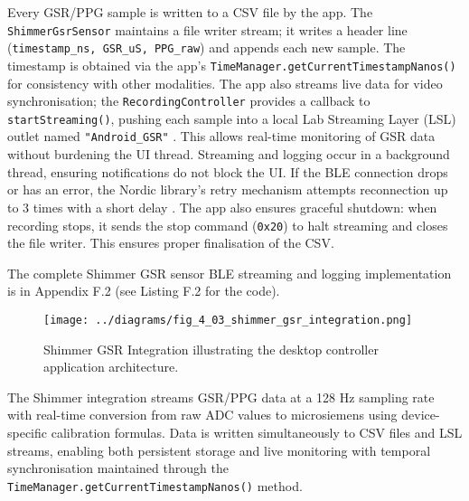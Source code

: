 Every GSR/PPG sample is written to a CSV file by the app. The \texttt{ShimmerGsrSensor} maintains a file writer stream; it writes a header line (\texttt{timestamp\_ns, GSR\_uS, PPG\_raw}) and appends each new sample. The timestamp is obtained via the app's \texttt{TimeManager.getCurrentTimestampNanos()} for consistency with other modalities. The app also streams live data for video synchronisation; the \texttt{RecordingController} provides a callback to \texttt{startStreaming()}, pushing each sample into a local Lab Streaming Layer (LSL) outlet named \texttt{"Android\_GSR"} \cite{ref9}. This allows real-time monitoring of GSR data without burdening the UI thread. Streaming and logging occur in a background thread, ensuring notifications do not block the UI. If the BLE connection drops or has an error, the Nordic library's retry mechanism attempts reconnection up to 3 times with a short delay \cite{ref14}. The app also ensures graceful shutdown: when recording stops, it sends the stop command (\texttt{0x20}) to halt streaming \cite{ref15} and closes the file writer. This ensures proper finalisation of the CSV.

The complete Shimmer GSR sensor BLE streaming and logging implementation is in Appendix F.2 (see Listing F.2 for the code).

\begin{figure}[htbp]
    \centring
    \texttt{[image: ../diagrams/fig\_4\_03\_shimmer\_gsr\_integration.png]}
    \caption{Shimmer GSR Integration illustrating the desktop controller application architecture.}
    \label{fig:4_03_shimmer_gsr_integration}
\end{figure}

The Shimmer integration streams GSR/PPG data at a 128 Hz sampling rate with real-time conversion from raw ADC values to microsiemens using device-specific calibration formulas. Data is written simultaneously to CSV files and LSL streams, enabling both persistent storage and live monitoring with temporal synchronisation maintained through the \texttt{TimeManager.getCurrentTimestampNanos()} method.


